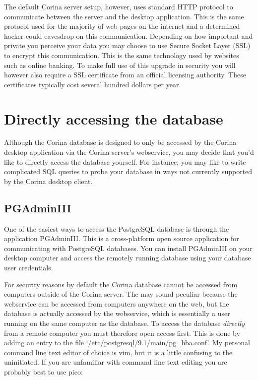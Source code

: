 The default Corina server setup, however, uses standard HTTP protocol to communicate between the server and the desktop application.  This is the same protocol used for the majority of web pages on the internet and a determined hacker could eavesdrop on this communication.  Depending on how important and private you perceive your data you may choose to use Secure Socket Layer (SSL) to encrypt this communication.  This is the same technology used by websites such as online banking.  To make full use of this upgrade in security you will however also require a SSL certificate from an official licensing authority.  These certificates typically cost several hundred dollars per year. 



\section{Directly accessing the database}
Although the Corina database is designed to only be accessed by the Corina desktop application via the Corina server's webservice, you may decide that you'd like to directly access the database yourself.  For instance, you may like to write complicated SQL queries to probe your database in ways not currently supported by the Corina desktop client. 


\subsection{PGAdminIII}
One of the easiest ways to access the PostgreSQL database is through the application PGAdminIII.  This is a cross-platform open source application for communicating with PostgreSQL databases.  You can install PGAdminIII on your desktop computer and access the remotely running database using your database user credentials.  

For security reasons by default the Corina database cannot be accessed from computers outside of the Corina server.  The may sound peculiar because the webservice can be accessed from computers anywhere on the web, but the database is actually accessed by the webservice, which is essentially a user running on the same computer as the database.  To access the database \emph{directly} from a remote computer you must therefore open access first.  This is done by adding an entry to the file `/etc/postgresql/9.1/main/pg\_hba.conf'.  My personal command line text editor of choice is vim, but it is a little confusing to the uninitiated.  If you are unfamiliar with command line text editing you are probably best to use pico:

